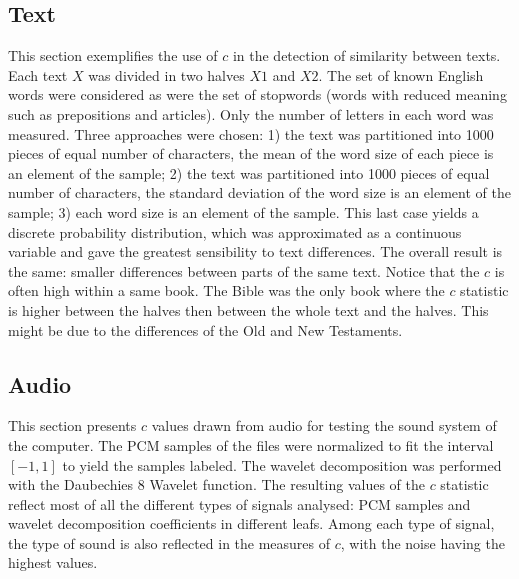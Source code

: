 \documentclass[%
	aip,
	jmp,%
	amsmath,amssymb,
	reprint,%
]{revtex4-1}
\begin{document}
\subsection{Text}
This section exemplifies the use of $c$
in the detection of similarity between texts.
Each text $X$ was divided in two halves $X1$ and $X2$.
The set of known English words were considered as were 
the set of stopwords (words with reduced meaning such
as prepositions and articles).
Only the number of letters in each word was measured.
Three approaches were chosen: 1) the text was partitioned into 1000 pieces of equal number of characters, the mean of the word size of each piece is an element of the sample; 2) the text was partitioned into 1000 pieces of equal number of characters, the standard deviation of the word size is an element of the sample; 3) each word size is an element of the sample.
This last case yields a discrete probability distribution, which was approximated as a continuous variable and gave the greatest sensibility to text differences.
The overall result is the same: smaller differences between parts
of the same text.
Notice that the $c$ is often high within a same book.
The Bible was the only book where the $c$ statistic is higher between the halves
then between the whole text and the halves.
This might be due to the differences of the Old and New Testaments.









\FloatBarrier
\subsection{Audio}
This section presents $c$ values
drawn from audio for testing the sound system of the computer.
The PCM samples of the files were normalized to fit the interval
$[-1,1]$ to yield the samples labeled. The wavelet decomposition was performed with the Daubechies 8 Wavelet function.
The resulting values of the $c$ statistic reflect most of all the
different types of signals analysed:
PCM samples and wavelet decomposition coefficients in different leafs.
Among each type of signal, the type of sound is also reflected in the measures of $c$, with the noise having the highest values.




\FloatBarrier
\end{document}
